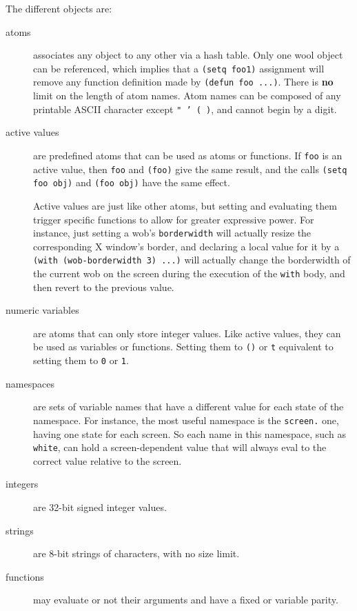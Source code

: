 The different {\WOOL} objects are:

\begin{description}

\item[atoms] associates any {\WOOL} object to any other via a hash table.
Only one wool object can be referenced, which implies that a \verb"(setq foo1)"
assignment will remove any function definition made by \verb"(defun foo ...)".
There is {\bf no} limit on the length of atom names. Atom names can
be composed of any printable ASCII character except {\tt " ' ( )}, and
cannot begin by a digit.

\item[active values] are predefined atoms that can be used as atoms or
functions. If \verb"foo" is an active value, then \verb"foo" and
\verb"(foo)" give the same result, and the calls \verb"(setq foo obj)" and
\verb"(foo obj)" have the same effect.

Active values are just like other atoms, but setting and evaluating them
trigger specific functions to allow for greater expressive power. For
instance, just setting a wob's \verb"borderwidth" will actually resize the
corresponding X window's border, and declaring a local value for it by a
\verb"(with (wob-borderwidth 3) ...)" will actually change the borderwidth
of the current wob on the screen during the execution of the \verb"with"
body, and then revert to the previous value.

\item[numeric variables] are atoms that can only store integer values. Like
active values, they can be used as variables or functions. Setting them to 
\verb"()" or \verb"t" equivalent to setting them to \verb"0" or \verb"1".

\item[namespaces] are sets of variable names that have a different value for 
each state of the namespace. For instance, the most useful namespace is the
\verb"screen." one, having one state for each screen. So each name in this
namespace, such as \verb"white", can hold a screen-dependent value that will
always eval to the correct value relative to the screen.

\item[integers] are 32-bit signed integer values.

\item[strings] are 8-bit strings of characters, with no size limit.

\item[functions] may evaluate or not their arguments and have a fixed
or variable parity.


\end{description}
